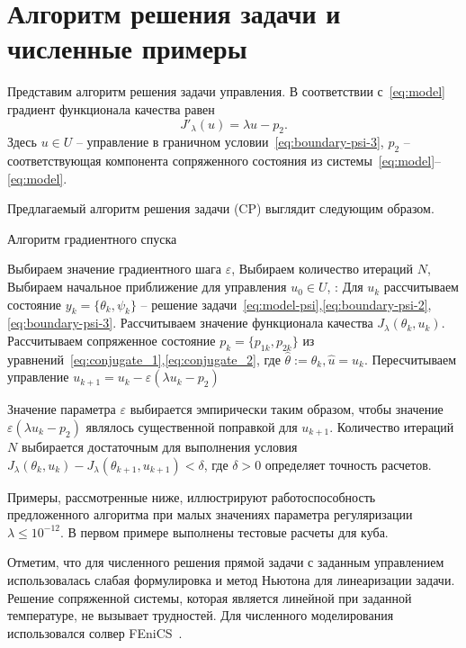 \usepackage{graphicx}\section{Алгоритм решения задачи и численные примеры}\label{sec:experiments}
Представим алгоритм решения задачи управления.
В соответствии с~\eqref{eq:model} градиент функционала качества равен
\[
    J'_\lambda (u) = \lambda u - p_2.
\]
Здесь $u\in U$ -- управление в граничном условии~\eqref{eq:boundary-psi-3}, $p_2$ -- соответствующая компонента
сопряженного состояния из системы~\eqref{eq:model}--\eqref{eq:model}.

Предлагаемый алгоритм решения задачи (CP) выглядит следующим образом.
\begin{algorithm}[H]
    \caption{Алгоритм градиентного спуска}
    \begin{algorithmic}[1]
        \State Выбираем значение градиентного шага $\varepsilon$,
        \State Выбираем количество итераций $N$,
        \State Выбираем начальное приближение для управления $u_0 \in U$,
            :
            \State Для $u_k$ рассчитываем состояние $ y_k = \{\theta_k, \psi_k\} $ --
            решение задачи~\eqref{eq:model-psi},\eqref{eq:boundary-psi-2},\eqref{eq:boundary-psi-3}.
            \State Рассчитываем значение функционала качества $J_\lambda(\theta_k, u_k)$.
            \State Рассчитываем сопряженное состояние $p_k=\{p_{1k},p_{2k}\}$ из
            уравнений~\eqref{eq:conjugate_1},\eqref{eq:conjugate_2},
            где $ \hat{\theta} := \theta_k, \hat{u}=u_k$.
            \State Пересчитываем управление $u_{k+1} = u_k - \varepsilon (\lambda u_k - p_2)$
        \EndFor
    \end{algorithmic}\label{alg:algorithm}
\end{algorithm}

Значение параметра $\varepsilon$ выбирается эмпирически таким образом, чтобы значение
$\varepsilon (\lambda u_k - p_2)$ являлось существенной поправкой для $u_{k+1}$.
Количество итераций $N$ выбирается достаточным для выполнения условия
$J_\lambda(\theta_k, u_k) - J_\lambda(\theta_{k+1}, u_{k+1}) < \delta$, где $\delta>0$ определяет точность расчетов.

Примеры, рассмотренные ниже, иллюстрируют работоспособность предложенного алгоритма при
малых значениях параметра регуляризации $\lambda \leq 10^{-12}$.
В первом примере выполнены тестовые расчеты для куба.

Отметим, что для численного решения прямой задачи с заданным
управлением использовалась слабая формулировка
и метод Ньютона для линеаризации задачи.
Решение сопряженной системы, которая является линейной при
заданной температуре, не вызывает трудностей.
Для численного моделирования использовался солвер FEniCS~\cite{fenics, dolfin}.

